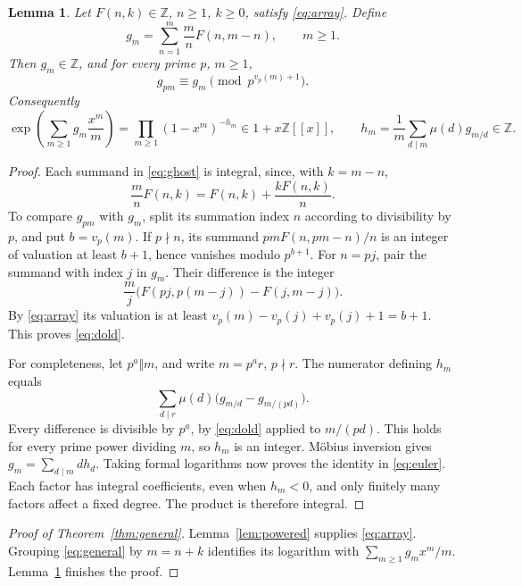 \documentclass[11pt]{article}
\newtheorem{lemma}[theorem]{Lemma}
\begin{document}
\begin{lemma}\label{lem:criterion}
Let \(F(n,k)\in\mathbb Z\), \(n\ge1\), \(k\ge0\), satisfy
\eqref{eq:array}. Define
\begin{equation}\label{eq:ghost}
 g_m=\sum_{n=1}^m\frac{m}{n}F(n,m-n),\qquad m\ge1.
\end{equation}
Then \(g_m\in\mathbb Z\), and for every prime \(p\), \(m\ge1\),
\begin{equation}\label{eq:dold}
 g_{pm}\equiv g_m\pmod {p^{v_p(m)+1}}.
\end{equation}
Consequently
\begin{equation}\label{eq:euler}
 \exp\left(\sum_{m\ge1}g_m\frac{x^m}{m}\right)
  =\prod_{m\ge1}(1-x^m)^{-h_m}\in1+x\mathbb Z[[x]],
 \qquad h_m=\frac1m\sum_{d\mid m}\mu(d)g_{m/d}\in\mathbb Z.
\end{equation}
\end{lemma}
\begin{proof}
Each summand in \eqref{eq:ghost} is integral, since, with \(k=m-n\),
\[
 \frac{m}{n}F(n,k)=F(n,k)+\frac{kF(n,k)}{n}.
\]
To compare \(g_{pm}\) with \(g_m\), split its summation index \(n\)
according to divisibility by \(p\), and put \(b=v_p(m)\).
If \(p\nmid n\), its summand \(pmF(n,pm-n)/n\) is an integer of
valuation at least \(b+1\), hence vanishes modulo \(p^{b+1}\).
For \(n=pj\), pair the summand with index \(j\) in \(g_m\).
Their difference is the integer
\[
 \frac{m}{j}\bigl(F(pj,p(m-j))-F(j,m-j)\bigr).
\]
By \eqref{eq:array} its valuation is at least
\(v_p(m)-v_p(j)+v_p(j)+1=b+1\). This proves \eqref{eq:dold}.

For completeness, let \(p^a\Vert m\), and write \(m=p^a r\), \(p\nmid r\).
The numerator defining \(h_m\) equals
\[
 \sum_{d\mid r}\mu(d)
       \bigl(g_{m/d}-g_{m/(pd)}\bigr).
\]
Every difference is divisible by \(p^a\), by \eqref{eq:dold} applied to
\(m/(pd)\). This holds for every prime power dividing \(m\), so \(h_m\)
is an integer. M\"obius inversion gives \(g_m=\sum_{d\mid m}dh_d\).
Taking formal logarithms now proves the identity in \eqref{eq:euler}.
Each factor has integral coefficients, even when \(h_m<0\), and only
finitely many factors affect a fixed degree. The product is therefore integral.
\end{proof}

\begin{proof}[Proof of Theorem~\ref{thm:general}]
Lemma~\ref{lem:powered} supplies \eqref{eq:array}.
Grouping \eqref{eq:general} by \(m=n+k\) identifies its logarithm with
\(\sum_{m\ge1}g_m x^m/m\). Lemma~\ref{lem:criterion} finishes the proof.
\end{proof}
\end{document}
